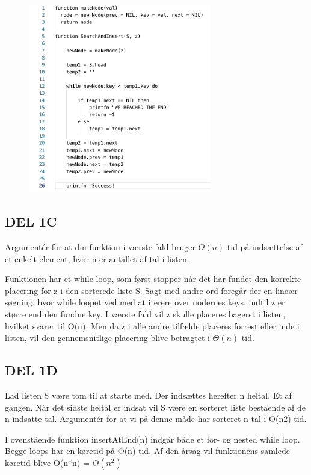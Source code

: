 \documentclass[a4paper]{article}
\begin{document}
\begin{figure}[h]
\centering
\includegraphics[width=8cm]{del1b.png}
\end{figure}


\subsection{DEL 1C}
Argumentér for at din funktion i værste fald bruger $\Theta(n)$ tid på indsættelse af et enkelt element, hvor n er antallet af tal i listen.

\bigskip\noindent
Funktionen har et while loop, som først stopper når det har fundet den korrekte placering for z i den sorterede liste S. Sagt med andre ord foregår der en lineær søgning, hvor while loopet ved med at iterere over nodernes keys, indtil z er større end den fundne key. I værste fald vil z skulle placeres bagerst i listen, hvilket svarer til O(n). Men da z i alle andre tilfælde placeres forrest eller inde i listen, vil den gennemsnitlige placering blive betragtet i $\Theta(n)$ tid. 

\subsection{DEL 1D}
Lad listen S være tom til at starte med. Der indsættes herefter n heltal. Et af gangen. Når det sidste heltal er indsat vil S være en sorteret liste bestående af de n indsatte tal. Argumentér for at vi på denne måde har sorteret n tal i O(n2) tid.

\noindent
I ovenstående funktion insertAtEnd(n) indgår både et for- og nested while loop. Begge loops har en køretid på O(n) tid. Af den årsag vil funktionens samlede køretid blive O(n*n) = $O(n^2)$
\end{document}
